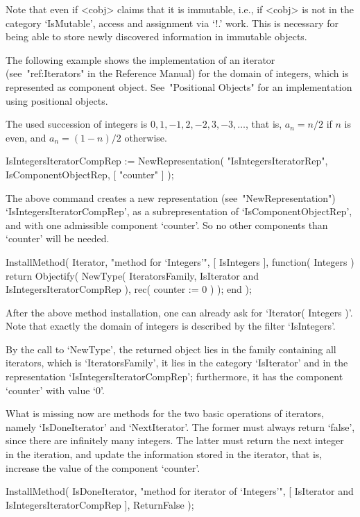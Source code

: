 Note that even if <cobj> claims that it is immutable, i.e., if <cobj>
is not in the category `IsMutable', access and assignment via `!.' work.
This is necessary for being able to store newly discovered information
in immutable objects.

The following example shows the implementation of an iterator
(see~"ref:Iterators" in the Reference Manual) for the domain of integers,
which is represented as component object.
See~"Positional Objects" for an implementation using positional objects.

The used succession of integers is $0, 1, -1, 2, -2, 3, -3, \ldots$,
that is, $a_n = n/2$ if $n$ is even,
and $a_n = (1-n)/2$ otherwise.

\begintt
IsIntegersIteratorCompRep := NewRepresentation( "IsIntegersIteratorRep",
    IsComponentObjectRep, [ "counter" ] );
\endtt

The above command creates a new representation (see~"NewRepresentation")
`IsIntegersIteratorCompRep',
as a subrepresentation of `IsComponentObjectRep',
and with one admissible component `counter'.
So no other components than `counter' will be needed.

\begintt
InstallMethod( Iterator,
    "method for `Integers'",
    [ IsIntegers ],
    function( Integers )
    return Objectify( NewType( IteratorsFamily,
                                   IsIterator
                               and IsIntegersIteratorCompRep ),
                      rec( counter := 0 ) );
    end );
\endtt

After the above method installation, one can already ask for
`Iterator( Integers )'.
Note that exactly the domain of integers is described by
the filter `IsIntegers'.

By the call to `NewType', the returned object lies in the family
containing all iterators, which is `IteratorsFamily',
it lies in the category `IsIterator' and in the representation
`IsIntegersIteratorCompRep';
furthermore, it has the component `counter' with value `0'.

What is missing now are methods for the two basic operations
of iterators, namely `IsDoneIterator' and `NextIterator'.
The former must always return `false', since there are infinitely
many integers.
The latter must return the next integer in the iteration,
and update the information stored in the iterator,
that is, increase the value of the component `counter'.

\begintt
InstallMethod( IsDoneIterator,
    "method for iterator of `Integers'",
    [ IsIterator and IsIntegersIteratorCompRep ],
    ReturnFalse );

